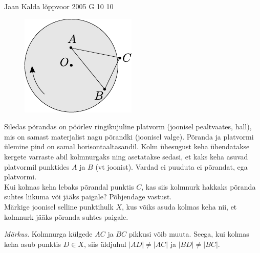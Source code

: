 \documentclass[11pt]{article}
\begin{document}
{%
{Jaan Kalda} %
{lõppvoor} %
{2005} %
{G 10} %
{10} %
{
\ifStatement
\begin{figure}
	\begin{center}
		\vspace{-20pt}
		\includegraphics[width=\linewidth]{2005-v3g-10-yl}
	\end{center}
\end{figure}
Siledas põrandas on pöörlev ringikujuline platvorm (joonisel pealtvaates, hall), mis on samast materjalist nagu põrandki (joonisel valge). Põranda ja platvormi ülemine pind on samal horisontaaltasandil. Kolm ühesugust keha ühendatakse kergete varraste abil kolmnurgaks ning asetatakse sedasi, et kaks keha asuvad platvormil punktides $A$ ja $B$ (vt joonist). Vardad ei puuduta ei põrandat, ega platvormi.\\
\osa Kui kolmas keha lebaks põrandal punktis $C$, kas siis kolmnurk hakkaks põranda suhtes liikuma või jääks paigale? Põhjendage vastust.\\
\osa Märkige joonisel selline punktihulk $X$, kus võiks asuda kolmas keha nii, et kolmnurk jääks põranda suhtes paigale.

\emph{Märkus}. Kolmnurga külgede $AC$ ja $BC$ pikkusi võib muuta. Seega, kui kolmas keha asub punktis $D \in X$, siis üldjuhul $|AD| \neq |AC|$ ja $|BD| \neq |BC|$.
\fi
}
\newpage\subsection{\protect{}}

}
\end{document}
